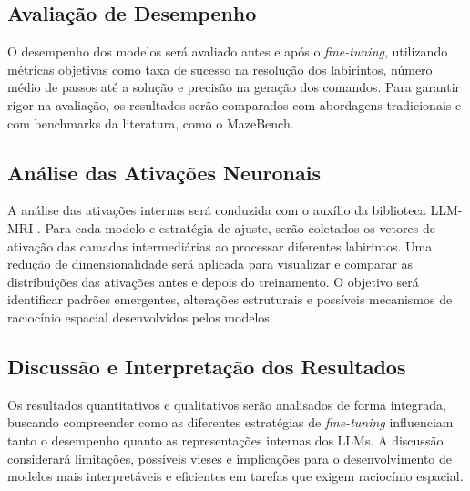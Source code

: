 \subsection{Avaliação de Desempenho}

O desempenho dos modelos será avaliado antes e após o \textit{fine-tuning}, utilizando métricas objetivas como taxa de sucesso na resolução dos labirintos, número médio de passos até a solução e precisão na geração dos comandos. Para garantir rigor na avaliação, os resultados serão comparados com abordagens tradicionais e com benchmarks da literatura, como o MazeBench.

\subsection{Análise das Ativações Neuronais}

A análise das ativações internas será conduzida com o auxílio da biblioteca LLM-MRI \cite{costa2024llmmri}. Para cada modelo e estratégia de ajuste, serão coletados os vetores de ativação das camadas intermediárias ao processar diferentes labirintos. Uma redução de dimensionalidade será aplicada para visualizar e comparar as distribuições das ativações antes e depois do treinamento. O objetivo será identificar padrões emergentes, alterações estruturais e possíveis mecanismos de raciocínio espacial desenvolvidos pelos modelos.

\subsection{Discussão e Interpretação dos Resultados}

Os resultados quantitativos e qualitativos serão analisados de forma integrada, buscando compreender como as diferentes estratégias de \textit{fine-tuning} influenciam tanto o desempenho quanto as representações internas dos LLMs. A discussão considerará limitações, possíveis vieses e implicações para o desenvolvimento de modelos mais interpretáveis e eficientes em tarefas que exigem raciocínio espacial.
